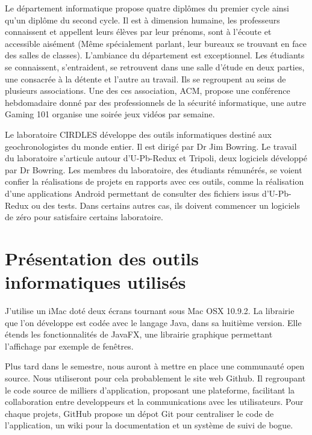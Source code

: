 Le département informatique propose quatre diplômes du premier cycle ainsi qu’un diplôme du second cycle. Il est à dimension humaine, les professeurs connaissent et appellent leurs élèves par leur prénoms, sont à l’écoute et accessible aisément (Même spécialement parlant, leur bureaux se trouvant en face des salles de classes).
L’ambiance du département est exceptionnel. Les étudiants se connaissent, s’entraident, se retrouvent dans une salle d’étude en deux parties, une consacrée à la détente et l’autre au travail. Ils se regroupent au seins de plusieurs associations. Une des ces association, ACM, propose une conférence hebdomadaire donné par des professionnels de la sécurité informatique, une autre Gaming 101 organise une soirée jeux vidéos par semaine.

Le laboratoire CIRDLES développe des outils informatiques destiné aux geochronologistes du monde entier. Il est dirigé par Dr Jim Bowring. Le travail du laboratoire s’articule autour d’U-Pb-Redux et Tripoli, deux logiciels développé par Dr Bowring. Les membres du laboratoire, des étudiants rémunérés, se voient confier la réalisations de projets en rapports avec ces outils, comme la réalisation d’une applications Android permettant de consulter des fichiers issus d’U-Pb-Redux ou des tests. Dans certains autres cas, ils doivent commencer un logiciels de zéro pour satisfaire certains laboratoire.

\section{Présentation des outils informatiques utilisés}

J’utilise un iMac doté deux écrans tournant sous Mac OSX 10.9.2. La librairie que l’on développe est codée avec le langage Java, dans sa huitième version. Elle étends les fonctionnalités de JavaFX, une librairie graphique permettant l’affichage par exemple de fenêtres.

Plus tard dans le semestre, nous auront à mettre en place une communauté open source. Nous utiliseront pour cela probablement le site web Github. Il regroupant le code source de milliers d’application, proposant une plateforme, facilitant la collaboration entre developpeurs et la communications avec les utilisateurs. Pour chaque projets, GitHub propose un dépot Git pour centraliser le code de l’application, un wiki pour la documentation et un système de suivi de bogue.
